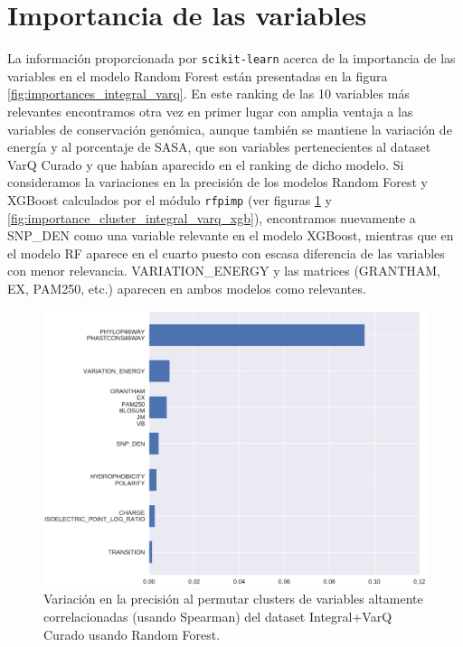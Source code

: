 \section{Importancia de las variables}
La información proporcionada por \texttt{scikit-learn} acerca de la importancia de las variables en el modelo Random Forest están presentadas en la figura \ref{fig:importances_integral_varq}. En este ranking de las 10 variables más relevantes encontramos otra vez en primer lugar con amplia ventaja a las variables de conservación genómica, aunque también se mantiene la variación de energía y al porcentaje de SASA, que son variables pertenecientes al dataset VarQ Curado y que habían aparecido en el ranking de dicho modelo. Si consideramos la variaciones en la precisión de los modelos Random Forest y XGBoost calculados por el módulo \texttt{rfpimp} (ver figuras \ref{fig:importance_cluster_integral_varq} y \ref{fig:importance_cluster_integral_varq_xgb}), encontramos nuevamente a SNP\_DEN como una variable relevante en el modelo XGBoost, mientras que en el modelo RF aparece en el cuarto puesto con escasa diferencia de las variables con menor relevancia. VARIATION\_ENERGY y las matrices (GRANTHAM, EX, PAM250, etc.) aparecen en ambos modelos como relevantes. 

\begin{figure}[H]
    \centering
    \includegraphics[scale=0.45]{documents/latex/figures/3/integral_varq/integral_varq_importance_cluster.pdf}
    \caption{Variación en la precisión al permutar clusters de variables altamente correlacionadas (usando Spearman) del dataset Integral+VarQ Curado usando Random Forest.}
    \label{fig:importance_cluster_integral_varq}
\end{figure}

